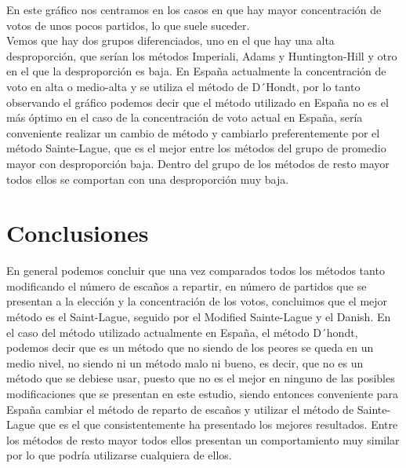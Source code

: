 \documentclass[12pt,a4paper,]{book}
\def\ifdoblecara{} %
\def\ifprincipal{} %
\numberwithin{dummy}{section}
\theoremstyle{ocrenumbox}
\theoremstyle{blacknumex}
\theoremstyle{blacknumbox}
\theoremstyle{ocrenum}
\theoremstyle{ocrenum}
\begin{document}
En este gráfico nos centramos en los casos en que hay mayor
concentración de votos de unos pocos partidos, lo que suele suceder.\\
Vemos que hay dos grupos diferenciados, uno en el que hay una alta
desproporción, que serían los métodos Imperiali, Adams y Huntington-Hill
y otro en el que la desproporción es baja. En España actualmente la
concentración de voto en alta o medio-alta y se utiliza el método de
D´Hondt, por lo tanto observando el gráfico podemos decir que el método
utilizado en España no es el más óptimo en el caso de la concentración
de voto actual en España, sería conveniente realizar un cambio de método
y cambiarlo preferentemente por el método Sainte-Lague, que es el mejor
entre los métodos del grupo de promedio mayor con desproporción baja.
Dentro del grupo de los métodos de resto mayor todos ellos se comportan
con una desproporción muy baja.

\hypertarget{conclusiones}{%
\section{Conclusiones}\label{conclusiones}}

En general podemos concluir que una vez comparados todos los métodos
tanto modificando el número de escaños a repartir, en número de partidos
que se presentan a la elección y la concentración de los votos,
concluimos que el mejor método es el Saint-Lague, seguido por el
Modified Sainte-Lague y el Danish. En el caso del método utilizado
actualmente en España, el método D´hondt, podemos decir que es un método
que no siendo de los peores se queda en un medio nivel, no siendo ni un
método malo ni bueno, es decir, que no es un método que se debiese usar,
puesto que no es el mejor en ninguno de las posibles modificaciones que
se presentan en este estudio, siendo entonces conveniente para España
cambiar el método de reparto de escaños y utilizar el método de
Sainte-Lague que es el que consistentemente ha presentado los mejores
resultados. Entre los métodos de resto mayor todos ellos presentan un
comportamiento muy similar por lo que podría utilizarse cualquiera de
ellos.

\FloatBarrier

\ifdefined\ifprincipal
\else
\setlength{\parindent}{1em}
\pagestyle{fancy}
\setcounter{tocdepth}{4}
\tableofcontents

\fi

\ifdefined\ifdoblecara
\fancyhead{}{}
\fancyhead[LE,RO]{\scriptsize\rightmark}
\fancyfoot[LO,RE]{\scriptsize\slshape \leftmark}
\fancyfoot[C]{}
\fancyfoot[LE,RO]{\footnotesize\thepage}
\else
\fancyhead{}{}
\fancyhead[RO]{\scriptsize\rightmark}
\fancyfoot[LO]{\scriptsize\slshape \leftmark}
\fancyfoot[C]{}
\fancyfoot[RO]{\footnotesize\thepage}
\fi
\renewcommand{\headrulewidth}{0.4pt}
\renewcommand{\footrulewidth}{0.4pt}
\end{document}
